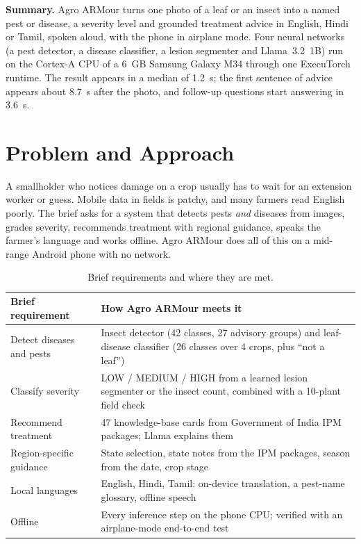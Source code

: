 \documentclass[11pt,a4paper]{article}
\begin{document}
\begin{titlepage}
\begin{minipage}{0.86\linewidth}
\textbf{Summary.} Agro ARMour turns one photo of a leaf or an insect into a named pest or disease, a severity level and
grounded treatment advice in English, Hindi or Tamil, spoken aloud, with the phone in airplane mode. Four neural
networks (a pest detector, a disease classifier, a lesion segmenter and Llama~3.2~1B) run on the Cortex-A CPU of a
6~GB Samsung Galaxy M34 through one ExecuTorch runtime. The result appears in a median of 1.2~s; the first sentence of
advice appears about 8.7~s after the photo, and follow-up questions start answering in 3.6~s.
\end{minipage}
\vspace{1.4cm}
\end{titlepage}

\tableofcontents
\newpage

\section{Problem and Approach}

A smallholder who notices damage on a crop usually has to wait for an extension worker or guess. Mobile data in fields
is patchy, and many farmers read English poorly. The brief asks for a system that detects pests \emph{and} diseases
from images, grades severity, recommends treatment with regional guidance, speaks the farmer's language and works
offline. Agro ARMour does all of this on a mid-range Android phone with no network.

\begin{table}[h]
\centering\small
\begin{tabularx}{\linewidth}{@{}p{3.6cm}L@{}}
\toprule
\textbf{Brief requirement} & \textbf{How Agro ARMour meets it} \\
\midrule
Detect diseases and pests & Insect detector (42 classes, 27 advisory groups) and leaf-disease classifier (26 classes over 4 crops, plus ``not a leaf'') \\
Classify severity & LOW / MEDIUM / HIGH from a learned lesion segmenter or the insect count, combined with a 10-plant field check \\
Recommend treatment & 47 knowledge-base cards from Government of India IPM packages; Llama explains them \\
Region-specific guidance & State selection, state notes from the IPM packages, season from the date, crop stage \\
Local languages & English, Hindi, Tamil: on-device translation, a pest-name glossary, offline speech \\
Offline & Every inference step on the phone CPU; verified with an airplane-mode end-to-end test \\
\bottomrule
\end{tabularx}
\caption{Brief requirements and where they are met.}
\end{table}
\end{document}
